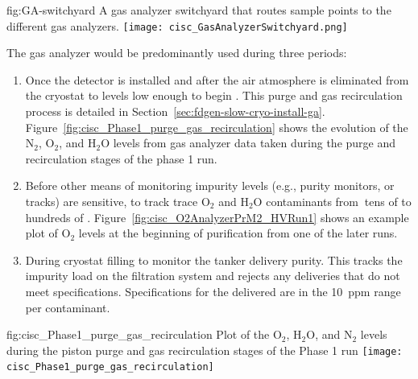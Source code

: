 \begin{dunefigure}{fig:GA-switchyard}
  {A gas analyzer switchyard that routes sample points to the different gas analyzers.}
  \texttt{[image: cisc\_GasAnalyzerSwitchyard.png]}
\end{dunefigure}

The gas analyzer would be predominantly used during three periods:

\begin{enumerate}
\item Once the detector is installed and after the air atmosphere is eliminated from the cryostat to levels low enough to begin \cooldown. This purge and gas recirculation process is detailed in Section~\ref{sec:fdgen-slow-cryo-install-ga}. Figure~\ref{fig:cisc_Phase1_purge_gas_recirculation} shows the evolution of the $\text{N}_2$, $\text{O}_2$, and $\text{H}_2\text{O}$ levels from gas analyzer data taken during the purge and recirculation stages of the   %
phase 1 run.


\item Before other means of monitoring impurity levels (e.g., purity monitors, or  tracks) are sensitive, to track trace $\text{O}_2$ and $\text{H}_2\text{O}$ contaminants from $\>$tens of  to hundreds of .  Figure~\ref{fig:cisc_O2AnalyzerPrM2_HVRun1} shows an example plot of $\text{O}_2$ levels at the beginning of  purification from one of the later   runs.

\item During cryostat filling to monitor the tanker  delivery purity. This tracks the impurity load on the filtration system and rejects any deliveries that do not meet specifications. %
Specifications for the delivered  are in the \SI{10}{ppm} range per contaminant.

\end{enumerate}

\begin{dunefigure}{fig:cisc_Phase1_purge_gas_recirculation}
  {Plot of the $\text{O}_2$, $\text{H}_2\text{O}$, and $\text{N}_2$ levels during the piston purge and gas recirculation stages of the  Phase 1 run}
  \texttt{[image: cisc\_Phase1\_purge\_gas\_recirculation]}
\end{dunefigure}

